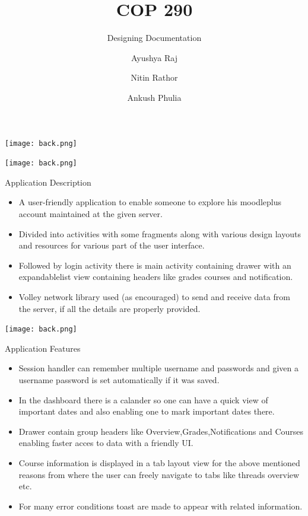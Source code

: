 \documentclass{beamer}
\title{COP 290}
\subtitle{Designing Documentation}
\author{Ayushya Raj \and Nitin Rathor \and Ankush Phulia}
\institute[IIT Delhi] 
{
  Department of Computer Science\\
  IIT Delhi}
\begin{document}
{\usebackgroundtemplate%
{\texttt{[image: back.png]}}
\begin{frame}
  \titlepage
\end{frame}
}
{\usebackgroundtemplate%
{\texttt{[image: back.png]}}
\begin{frame}{Application Description}{}
  \begin{itemize}
  \item {
   A user-friendly application to enable someone to explore his moodleplus account maintained at the given server.
  }
  \item {
    Divided into activities with some fragments along with various design layouts and resources for various part of the user interface.
  }
  \item {
    Followed by login activity there is main activity containing drawer with an expandablelist view containing headers like grades courses and notification.
  }
  \item{
  Volley network library used (as encouraged) to send and receive data from the server, if all the details are properly provided.
  }
  \end{itemize}
\end{frame}
}
{\usebackgroundtemplate%
{\texttt{[image: back.png]}}

\begin{frame}{Application Features}
  \begin{itemize}
  \item {
    Session handler can remember multiple username and passwords and given a username password is set automatically if it was saved.
  }
  \item {   
    In the dashboard there is a calander so  one can have a quick view of important dates and also enabling one to mark important dates there.
  }
  \item {
    Drawer contain group headers like Overview,Grades,Notifications and Courses enabling faster acces to data with a friendly UI.
  }
  \item {
    Course information is displayed in a tab layout view for the above mentioned reasons from where the user can freely navigate to tabs like threads overview etc.
  }
  \item {
    For many error conditions toast are made to appear with related information.
  }
  \end{itemize}
\end{frame}
}
\end{document}

